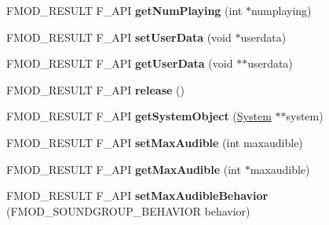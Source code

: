 \begin{DoxyCompactItemize}
\item 
\hypertarget{class_f_m_o_d_1_1_sound_group_af88057e101e4dd2268d1a6f6656db75b}{F\+M\+O\+D\+\_\+\+R\+E\+S\+U\+L\+T F\+\_\+\+A\+P\+I {\bfseries get\+Num\+Playing} (int $\ast$numplaying)}\label{class_f_m_o_d_1_1_sound_group_af88057e101e4dd2268d1a6f6656db75b}

\item 
\hypertarget{class_f_m_o_d_1_1_sound_group_a3315678b522baf2d74f732ab671f48c7}{F\+M\+O\+D\+\_\+\+R\+E\+S\+U\+L\+T F\+\_\+\+A\+P\+I {\bfseries set\+User\+Data} (void $\ast$userdata)}\label{class_f_m_o_d_1_1_sound_group_a3315678b522baf2d74f732ab671f48c7}

\item 
\hypertarget{class_f_m_o_d_1_1_sound_group_ac428e826a819030cbab7ffa666d7d9cd}{F\+M\+O\+D\+\_\+\+R\+E\+S\+U\+L\+T F\+\_\+\+A\+P\+I {\bfseries get\+User\+Data} (void $\ast$$\ast$userdata)}\label{class_f_m_o_d_1_1_sound_group_ac428e826a819030cbab7ffa666d7d9cd}

\item 
\hypertarget{class_f_m_o_d_1_1_sound_group_a184d5ee5cab2f885f21b2e23764e641d}{F\+M\+O\+D\+\_\+\+R\+E\+S\+U\+L\+T F\+\_\+\+A\+P\+I {\bfseries release} ()}\label{class_f_m_o_d_1_1_sound_group_a184d5ee5cab2f885f21b2e23764e641d}

\item 
\hypertarget{class_f_m_o_d_1_1_sound_group_a2997b6d45663014b03d44bf791d54187}{F\+M\+O\+D\+\_\+\+R\+E\+S\+U\+L\+T F\+\_\+\+A\+P\+I {\bfseries get\+System\+Object} (\hyperlink{class_f_m_o_d_1_1_system}{System} $\ast$$\ast$system)}\label{class_f_m_o_d_1_1_sound_group_a2997b6d45663014b03d44bf791d54187}

\item 
\hypertarget{class_f_m_o_d_1_1_sound_group_a8e3b6569d346e94cf3f23d789eae5b5f}{F\+M\+O\+D\+\_\+\+R\+E\+S\+U\+L\+T F\+\_\+\+A\+P\+I {\bfseries set\+Max\+Audible} (int maxaudible)}\label{class_f_m_o_d_1_1_sound_group_a8e3b6569d346e94cf3f23d789eae5b5f}

\item 
\hypertarget{class_f_m_o_d_1_1_sound_group_ac63af09a716e9598b04394986e813bbb}{F\+M\+O\+D\+\_\+\+R\+E\+S\+U\+L\+T F\+\_\+\+A\+P\+I {\bfseries get\+Max\+Audible} (int $\ast$maxaudible)}\label{class_f_m_o_d_1_1_sound_group_ac63af09a716e9598b04394986e813bbb}

\item 
\hypertarget{class_f_m_o_d_1_1_sound_group_a8f13ff7ef4a6e3768af07f3f1c64e3b3}{F\+M\+O\+D\+\_\+\+R\+E\+S\+U\+L\+T F\+\_\+\+A\+P\+I {\bfseries set\+Max\+Audible\+Behavior} (F\+M\+O\+D\+\_\+\+S\+O\+U\+N\+D\+G\+R\+O\+U\+P\+\_\+\+B\+E\+H\+A\+V\+I\+O\+R behavior)}\label{class_f_m_o_d_1_1_sound_group_a8f13ff7ef4a6e3768af07f3f1c64e3b3}


\end{DoxyCompactItemize}
